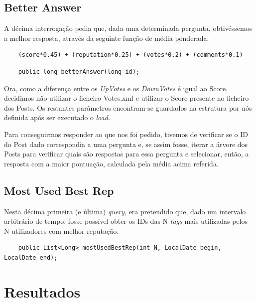 \documentclass[a4paper, 11pt, oneside]{article}
\begin{document}
\subsection{Better Answer}

A décima interrogação pedia que, dada uma determinada pergunta, obtivéssemos a melhor resposta, através da seguinte função de média ponderada:

\begin{verbatim}
	(score*0.45) + (reputation*0.25) + (votes*0.2) + (comments*0.1)
\end{verbatim}

\begin{lstlisting}
	public long betterAnswer(long id);
\end{lstlisting}

Ora, como a diferença entre os \textit{UpVotes} e os \textit{DownVotes} é igual ao Score, decidimos não utilizar o ficheiro Votes.xml e utilizar o Score presente no 
ficheiro dos Posts. Os restantes parâmetros encontram-se guardados na estrutura por nós definida após ser executado o \textit{load}.

Para conseguirmos responder ao que nos foi pedido, tivemos de verificar se o ID do Post dado correspondia a uma pergunta e, se assim fosse, iterar a árvore dos Posts 
para verificar quais são respostas para essa pergunta e selecionar, então, a resposta com a maior pontuação, calculada pela média acima referida.


\subsection{Most Used Best Rep}

Nesta décima primeira (e última) \textit{query}, era pretendido que, dado um intervalo arbitrário de tempo, fosse possível obter os IDs das N \textit{tags} mais 
utilizadas pelos N utilizadores com melhor reputação.

\begin{lstlisting}
	public List<Long> mostUsedBestRep(int N, LocalDate begin, LocalDate end);
\end{lstlisting}







\section{Resultados}
\end{document}
